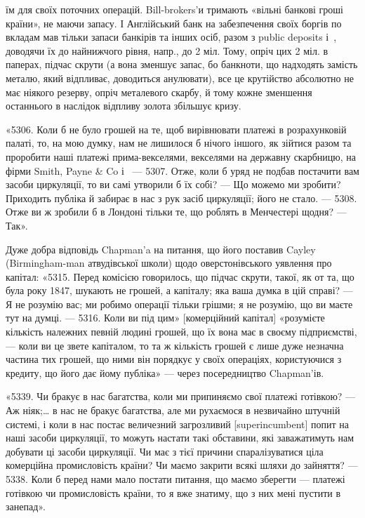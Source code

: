 \parcont{}  %
їм для своїх поточних операцій. Bill-brokers’и тримають «вільні банкові гроші
країни», не маючи запасу. І Англійський банк на забезпечення своїх боргів по
вкладам мав тільки запаси банкірів та інших осіб, разом з public deposits і~,
доводячи їх до найнижчого рівня, напр., до 2 міл. Тому, опріч цих 2 міл. в паперах,
підчас скрути (а вона зменшує запас, бо банкноти, що надходять замість
металю, який відпливає, доводиться анулювати), все це крутійство абсолютно
не має ніякого резерву, опріч металевого скарбу, й тому кожне зменшення останнього
в наслідок відпливу золота збільшує кризу.

«5306. Коли б не було грошей на те, щоб вирівнювати платежі в розрахунковій
палаті, то, на мою думку, нам не лишилося б нічого іншого, як
зійтися разом та проробити наші платежі прима-векселями, векселями на державну
скарбницю, на фірми Smith, Payne \& Co і~ — 5307. Отже, коли б
уряд не подбав постачити вам засоби циркуляції, то ви самі утворили б їх
собі? — Що можемо ми зробити? Приходить публіка й забирає в нас з рук
засіб циркуляції; його не стало. — 5308. Отже ви ж зробили б в Лондоні тільки
те, що роблять в Менчестері щодня? — Так».

Дуже добра відповідь Chapman’a на питання, що його поставив Cayley
(Birmingham-man атвудівської школи) щодо оверстонівського уявлення про
капітал: «5315. Перед комісією говорилось, що підчас скрути, такої, як от та,
що була року 1847, шукають не грошей, а капіталу; яка ваша думка в цій
справі? — Я не розумію вас; ми робимо операції тільки грішми; я не розумію,
що ви маєте тут на думці. — 5316. Коли ви під цим» [комерційний капітал]
«розумієте кількість належних певній людині грошей, що їх вона має в
своєму підприємстві, — коли ви це звете капіталом, то та ж кількість грошей є
лише дуже незначна частина тих грошей, що ними він порядкує у своїх операціях,
користуючися з кредиту, що його дає йому публіка» — через посередництво
Chapman’ів.

«5339. Чи бракує в нас багатства, коли ми припиняємо свої платежі готівкою?
— Аж ніяк;\dots{} в нас не бракує багатства, але ми рухаємося в незвичайно
штучній системі, і коли в нас постає величезний загрозливий [superincumbent]
попит на наші засоби циркуляції, то можуть настати такі обставини, які
заважатимуть нам добувати ці засоби циркуляції. Чи має з тієї причини спаралізуватися
ціла комерційна промисловість країни? Чи маємо закрити всякі
шляхи до зайняття? — 5338. Коли б перед нами мало постати питання, що
маємо зберегти — платежі готівкою чи промисловість країни, то я вже знатиму,
що з них мені пустити в занепад».

